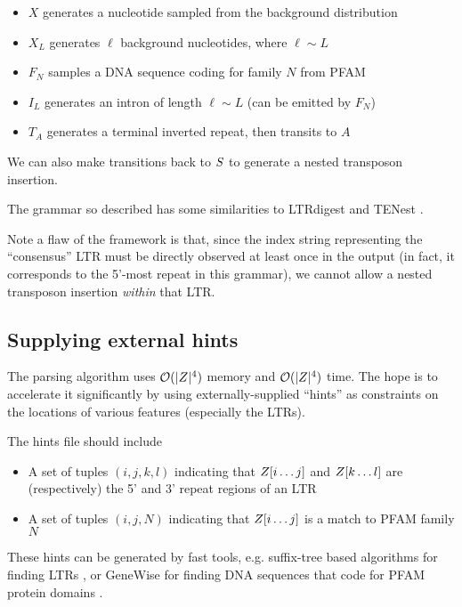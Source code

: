 \documentclass[10pt]{article}
\begin{document}
\begin{itemize}
\item $X$ generates a nucleotide sampled from the background distribution
\item $X_L$ generates $\ell$ background nucleotides, where $\ell \sim L$
\item $F_N$ samples a DNA sequence coding for family $N$ from PFAM \cite{Pfam2008}
\item $I_L$ generates an intron of length $\ell \sim L$ (can be emitted by $F_N$)
\item $T_A$ generates a terminal inverted repeat, then transits to $A$
\end{itemize}
We can also make transitions back to $S$ to generate a nested transposon insertion.

The grammar so described has some similarities to LTRdigest \cite{pmid19786494} and TENest \cite{KronmillerWise2008}.

Note a flaw of the framework is that, since the index string representing the ``consensus'' LTR must be directly observed at least once in the output
(in fact, it corresponds to the 5'-most repeat in this grammar), 
we cannot allow a nested transposon insertion {\em within} that LTR.


\subsection{Supplying external hints}

The parsing algorithm uses ${\cal O}(|Z|^4)$ memory and ${\cal O}(|Z|^4)$ time.
The hope is to accelerate it significantly by using externally-supplied ``hints''
as constraints on the locations of various features (especially the LTRs).

The hints file should include
\begin{itemize}
\item A set of tuples $(i,j,k,l)$ indicating that $Z[i \ldots j]$ and $Z[k \ldots l]$ are (respectively) the 5' and 3' repeat regions of an LTR
\item A set of tuples $(i,j,N)$ indicating that $Z[i \ldots j]$ is a match to PFAM family $N$
\end{itemize}

These hints can be generated by fast tools, e.g. suffix-tree based algorithms for finding LTRs \cite{pmid16819780},
or GeneWise for finding DNA sequences that code for PFAM protein domains \cite{BirneyEtAl04}.
\end{document}
